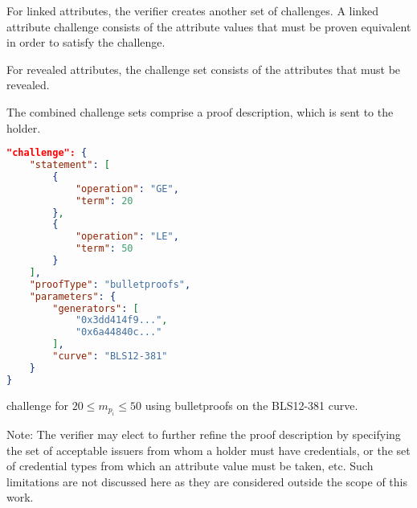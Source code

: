 \documentclass[a4paper]{article}
\begin{document}
For linked attributes, the verifier creates another set of challenges. A linked attribute challenge consists of the attribute values that must be proven equivalent in order to satisfy the challenge. 

For revealed attributes, the challenge set consists of the attributes that must be revealed.

The combined challenge sets comprise a proof description, which is sent to the holder.\newpage

\begin{lstlisting}[language=json]
"challenge": {
    "statement": [
        {
            "operation": "GE",
            "term": 20
        },
        {
            "operation": "LE",
            "term": 50
        }
    ],
    "proofType": "bulletproofs",
    "parameters": {
        "generators": [
            "0x3dd414f9...",
            "0x6a44840c..."
        ],
        "curve": "BLS12-381"
    }
}
\end{lstlisting}
\begin{center}
\begin{scriptsize}
    challenge for $20 \leq m_{p_i} \leq 50$ using bulletproofs on the BLS12-381 curve.
\end{scriptsize}
\end{center}


Note: The verifier may elect to further refine the proof description by specifying the set of acceptable issuers from whom a holder must have credentials, or the set of credential types from which an attribute value must be taken, etc. Such limitations are not discussed here as they are considered outside the scope of this work.
\end{document}

